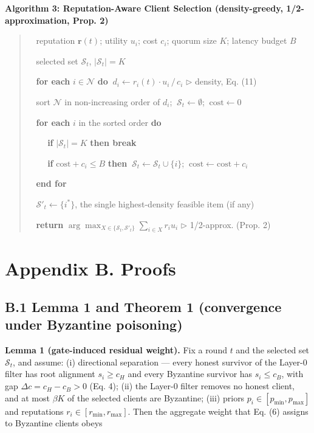 \documentclass[cmc,article,submit,moreauthors,pdftex]{Definitions/tsp}
\begin{document}
\vspace{0.5em}

\noindent\textbf{Algorithm 3: Reputation-Aware Client Selection (density-greedy, 1/2-approximation, Prop. 2)}

\begin{quote}
\noindent{}~ reputation $\mathbf{r}(t)$; utility $u_i$; cost $c_i$; quorum size $K$; latency budget $B$

\noindent{}~ selected set $\mathcal{S}_t$, $\lvert\mathcal{S}_t\rvert = K$

\noindent{}~ \textbf{for each} $i \in \mathcal{N}$ \textbf{do} $\ d_i \leftarrow r_i(t) \cdot u_i \,/\, c_i$  $\triangleright$ density, Eq. (11)

\noindent{}~ sort $\mathcal{N}$ in non-increasing order of $d_i$; $\ \mathcal{S}_t \leftarrow \emptyset$; $\ \mathrm{cost} \leftarrow 0$

\noindent{}~ \textbf{for each} $i$ in the sorted order \textbf{do}

\noindent{}~ $\quad$ \textbf{if} $\lvert\mathcal{S}_t\rvert = K$ \textbf{then break}

\noindent{}~ $\quad$ \textbf{if} $\mathrm{cost} + c_i \leq B$ \textbf{then} $\ \mathcal{S}_t \leftarrow \mathcal{S}_t \cup \{i\}$; $\ \mathrm{cost} \leftarrow \mathrm{cost} + c_i$

\noindent{}~ \textbf{end for}

\noindent{}~ $\mathcal{S}'_t \leftarrow \{i^*\}$, the single highest-density feasible item (if any)

\noindent{}~ \textbf{return} $\arg\max_{X \in \{\mathcal{S}_t, \mathcal{S}'_t\}} \sum_{i \in X} r_i u_i$  $\triangleright$ 1/2-approx. (Prop. 2)
\end{quote}

\section*{Appendix B. Proofs}

\subsection*{B.1 Lemma 1 and Theorem 1 (convergence under Byzantine poisoning)}

\textbf{Lemma 1 (gate-induced residual weight).} Fix a round $t$ and the selected set $\mathcal{S}_t$, and assume: (i) directional separation --- every honest survivor of the Layer-0 filter has root alignment $s_i \ge c_H$ and every Byzantine survivor has $s_i \le c_B$, with gap $\Delta c = c_H - c_B > 0$ (Eq. 4); (ii) the Layer-0 filter removes no honest client, and at most $\beta K$ of the selected clients are Byzantine; (iii) priors $p_i \in [p_{\min}, p_{\max}]$ and reputations $r_i \in [r_{\min}, r_{\max}]$. Then the aggregate weight that Eq. (6) assigns to Byzantine clients obeys
\end{document}
